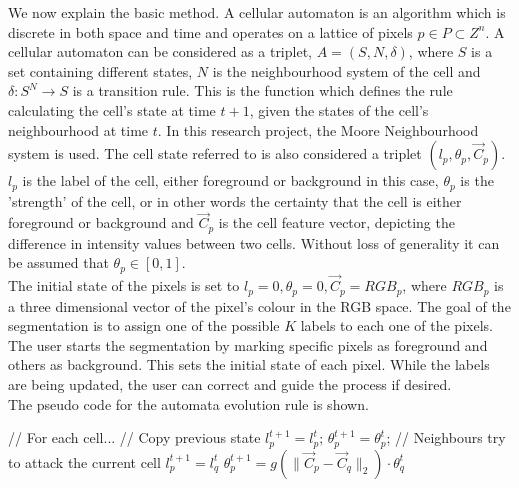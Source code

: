 \documentclass[a4paper,10pt]{article}
\begin{document}
\noindent We now explain the basic method\cite{alg}.  A
cellular automaton is an algorithm which is discrete in both space and time
and operates on a lattice of pixels $p \in P \subset Z^{n}$.  A cellular
automaton can be considered as a triplet, $A = (S, N, \delta)$, where $S$ is a
set containing different states, $N$ is the
neighbourhood system of the cell and $\delta: S^{N} \rightarrow S $ is a
transition rule.  This is the function which defines  the rule calculating the
cell's state at time $t + 1$, given the states 
of the cell's neighbourhood at time $t$.  In this research project, the Moore 
Neighbourhood system is used.  The cell state referred to
is also
considered a triplet $(l_{p}, \theta_{p}, \overrightarrow{C}_{p})$.
$l_{p}$ is the label of the cell, either foreground or background in this case, $\theta_{p}$ is the
'strength' of the cell, or in other words the certainty that the cell is either foreground or background and $\overrightarrow{C}_{p}$ is
the cell feature vector, depicting the difference in intensity values between two cells.  Without loss of generality it can be assumed that
$\theta_{p} \in [0,1]$.  \\

The initial state of the pixels is set to $l_{p} = 0, \theta_{p} = 0,
\overrightarrow{C}_{p} = RGB_{p}$, where $RGB_{p}$ is a three dimensional vector
of the pixel's colour in 
the RGB space.  The goal of the segmentation is to assign one of the possible
$K$ labels to each one of the pixels.  The user starts the segmentation by
marking specific pixels as foreground and others as background.  This sets the
initial state of each pixel.  While the labels are being updated, the user can
correct and guide the process if desired.  \\

\noindent The pseudo code for the automata evolution rule is shown\cite{alg}.
\begin{algorithm}[H]
\begin{algorithmic}[1]
 \State // For each cell...
 \State // Copy previous state
 \State $l^{t+1}_{p} = l^{t}_{p}$;
 \State $\theta_{p}^{t+1} = \theta_{p}^{t}$;
 \State // Neighbours try to attack the current cell
 \State $l^{t+1}_{p} = l^{t}_{q}$
 \State $\theta^{t+1}_{p} = g(\| \overrightarrow{C}_{p} - \overrightarrow{C}_{q}
\|_{2}) \cdot \theta^{t}_{q}$
 \EndIf
 \EndFor
 \EndFor
\end{algorithmic}
\end{algorithm}
\end{document}
